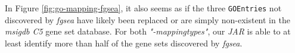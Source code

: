 \documentclass[12pt]{article}
\begin{document}
In Figure \ref{fig:go-mapping-fgsea}, it also seems as if the three \texttt{GOEntries} not discovered by 
\textit{fgsea} have likely been replaced or are simply non-existent in the \textit{msigdb C5}
gene set database. For both \textit{"-mappingtypes"}, our \textit{JAR} is able
to at least identify more than half of the gene sets discovered by \textit{fgsea}.






\printbibliography
\end{document}
